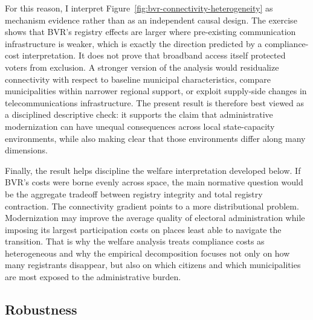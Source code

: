 For this reason, I interpret Figure~\ref{fig:bvr-connectivity-heterogeneity} as mechanism evidence rather than as an independent causal design. The exercise shows that BVR's registry effects are larger where pre-existing communication infrastructure is weaker, which is exactly the direction predicted by a compliance-cost interpretation. It does not prove that broadband access itself protected voters from exclusion. A stronger version of the analysis would residualize connectivity with respect to baseline municipal characteristics, compare municipalities within narrower regional support, or exploit supply-side changes in telecommunications infrastructure. The present result is therefore best viewed as a disciplined descriptive check: it supports the claim that administrative modernization can have unequal consequences across local state-capacity environments, while also making clear that those environments differ along many dimensions.

Finally, the result helps discipline the welfare interpretation developed below. If BVR's costs were borne evenly across space, the main normative question would be the aggregate tradeoff between registry integrity and total registry contraction. The connectivity gradient points to a more distributional problem. Modernization may improve the average quality of electoral administration while imposing its largest participation costs on places least able to navigate the transition. That is why the welfare analysis treats compliance costs as heterogeneous and why the empirical decomposition focuses not only on how many registrants disappear, but also on which citizens and which municipalities are most exposed to the administrative burden.

\subsection{Robustness}
\label{ssec:bvr-registry-robustness}

